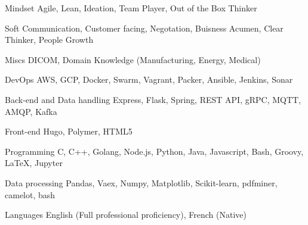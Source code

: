 

\begin{cvskills}
  \cvskill
  {Mindset} %
  {Agile, Lean, Ideation, Team Player, Out of the Box Thinker} %

  \cvskill
  {Soft} %
  {Communication, Customer facing, Negotation, Buisness Acumen, Clear Thinker, People Growth} %

  \cvskill
  {Miscs} %
  {DICOM, Domain Knowledge (Manufacturing, Energy, Medical)} %

  \cvskill
    {DevOps} %
    {AWS, GCP, Docker, Swarm, Vagrant, Packer, Ansible, Jenkins, Sonar} %

  \cvskill
    {Back-end and Data handling} %
    {Express, Flask, Spring, REST API, gRPC, MQTT, AMQP, Kafka} %

  \cvskill
    {Front-end} %
    {Hugo, Polymer, HTML5} %

  \cvskill
    {Programming} %
    {C, C++, Golang, Node.js, Python, Java, Javascript, Bash, Groovy, LaTeX, Jupyter} %

  \cvskill
    {Data processing} %
    {Pandas, Vaex, Numpy, Matplotlib, Scikit-learn, pdfminer, camelot, bash}  %

  \cvskill
    {Languages} %
    {English (Full professional proficiency), French (Native)} %

\end{cvskills}
